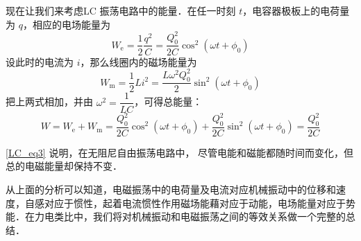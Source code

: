 现在让我们来考虑LC 振荡电路中的能量．在任一时刻 $t$，电容器极板上的电荷量为 $q$，相应的电场能量为
\begin{equation}
W_{\mathrm e}=\frac{1}{2} \frac{q^{2}}{C}=\frac{Q_{0}^{2}}{2 C} \cos ^{2}\left(\omega t+\phi_{0}\right)
\end{equation}
设此时的电流为 $i$，那么线圈内的磁场能量为
\begin{equation}
W_{\mathrm{m}}=\frac{1}{2} L i^{2}=\frac{L \omega^{2} Q_{0}^{2}}{2} \sin ^{2}\left(\omega t+\phi_{0}\right)
\end{equation}
把上两式相加，并由 $\omega^{2}=\dfrac{1}{L C}$，可得总能量：
\begin{equation} \label{LC_eq3}
W=W_{\mathrm{e}}+W_{\mathrm{m}}=\frac{Q_{0}^{2}}{2 C} \cos ^{2}\left(\omega t+\phi_{0}\right)+\frac{Q_{0}^{2}}{2 C} \sin ^{2}\left(\omega t+\phi_{0}\right)=\frac{Q_{0}^{2}}{2 C}
\end{equation}

\autoref{LC_eq3} 说明，在无阻尼自由振荡电路中， 尽管电能和磁能都随时间而变化，但总的电磁能量却保持不变．

从上面的分析可以知道，电磁振荡中的电荷量及电流对应机械振动中的位移和速度，自感对应于惯性，起着电流惯性作用磁场能藉对应于动能，电场能量对应于势能．在力电类比中，我们将对机械振动和电磁振荡之间的等效关系做一个完整的总结．

 
